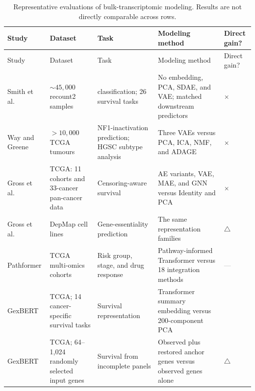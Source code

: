 \documentclass[11pt]{article}
\newcommand{\modelbetter}{\textcolor{green!50!black}{\checkmark}}
\newcommand{\modelnotbetter}{\textcolor{red!75!black}{\ensuremath{\times}}}
\newcommand{\modelconditional}{\textcolor{orange!80!black}{\ensuremath{\triangle}}}
\newcommand{\modeluntested}{\textcolor{gray}{---}}
\begin{document}
\begingroup
\footnotesize
\setlength{\parskip}{0pt}
\setlength{\tabcolsep}{4pt}
\renewcommand{\arraystretch}{1.2}
\begin{longtable}{
    >{\raggedright\arraybackslash}p{}
    >{\raggedright\arraybackslash}p{}
    >{\raggedright\arraybackslash}p{}
    >{\raggedright\arraybackslash}p{}
    >{\centering\arraybackslash}p{}}
\caption{Representative evaluations of bulk-transcriptomic modeling. Results
are not directly comparable across rows.}
\label{tab:bulk-evaluations}\\
\toprule
Study & Dataset & Task & Modeling method & Direct gain? \\
\midrule
\endfirsthead
\toprule
Study & Dataset & Task & Modeling method & Direct gain? \\
\midrule
\endhead
\bottomrule
\endfoot

Smith et al.\ \cite{smith2020standard}
& ${\sim}45{,}000$ recount2 samples
& 24 classification; 26 survival tasks
& No embedding, PCA, SDAE, and VAE; matched downstream predictors
& \modelnotbetter \\

Way and Greene \cite{way2017evaluating}
& ${>}10{,}000$ TCGA tumours
& NF1-inactivation prediction; HGSC subtype analysis
& Three VAEs versus PCA, ICA, NMF, and ADAGE
& \modelnotbetter \\

Gross et al.\ \cite{gross2024robust}
& TCGA: 11 cohorts and 33-cancer pan-cancer data
& Censoring-aware survival
& AE variants, VAE, MAE, and GNN versus Identity and PCA
& \modelnotbetter \\

Gross et al.\ \cite{gross2024robust}
& DepMap cell lines
& Gene-essentiality prediction
& The same representation families
& \modelconditional \\

Pathformer \cite{liu2024pathformer}
& TCGA multi-omics cohorts
& Risk group, stage, and drug response
& Pathway-informed Transformer versus 18 integration methods
& \modeluntested \\

GexBERT \cite{jiang2025gexbert}
& TCGA; 14 cancer-specific survival tasks
& Survival representation
& Transformer summary embedding versus 200-component PCA
& \modelbetter \\

GexBERT \cite{jiang2025gexbert}
& TCGA; 64--1,024 randomly selected input genes
& Survival from incomplete panels
& Observed plus restored anchor genes versus observed genes alone
& \modelconditional \\


\end{longtable}
\end{document}
